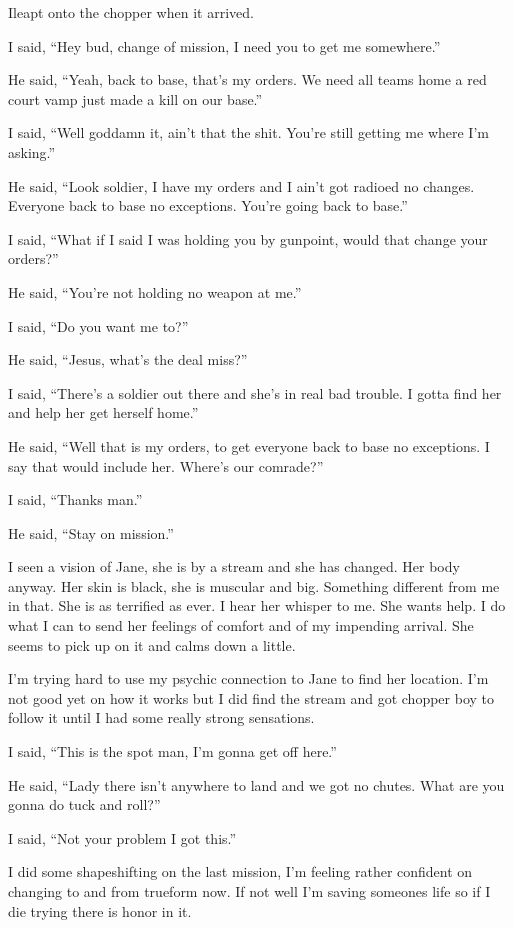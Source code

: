 \lettrine[lines=2,lraise=0]{I}\space leapt onto the chopper when it arrived.

I said, ``Hey bud, change of mission, I need you to get me somewhere.''

He said, ``Yeah, back to base, that's my orders. We need all teams home a red court vamp just made a kill on our base.''

I said, ``Well goddamn it, ain't that the shit. You're still getting me where I'm asking.''

He said, ``Look soldier, I have my orders and I ain't got radioed no changes. Everyone back to base no exceptions. You're going back to base.''

I said, ``What if I said I was holding you by gunpoint, would that change your orders?''

He said, ``You're not holding no weapon at me.''

I said, ``Do you want me to?''

He said, ``Jesus, what's the deal miss?''

I said, ``There's a soldier out there and she's in real bad trouble. I gotta find her and help her get herself home.''

He said, ``Well that is my orders, to get everyone back to base no exceptions. I say that would include her. Where's our comrade?''

I said, ``Thanks man.''

He said, ``Stay on mission.''


I seen a vision of Jane, she is by a stream and she has changed. Her body anyway. Her skin is black, she is muscular and big. Something different from me in that. She is as terrified as ever. I hear her whisper to me. She wants help. I do what I can to send her feelings of comfort and of my impending arrival. She seems to pick up on it and calms down a little.

\parasep

I'm trying hard to use my psychic connection to Jane to find her location. I'm not good yet on how it works but I did find the stream and got chopper boy to follow it until I had some really strong sensations.

I said, ``This is the spot man, I'm gonna get off here.''

He said, ``Lady there isn't anywhere to land and we got no chutes. What are you gonna do tuck and roll?''

I said, ``Not your problem I got this.''

I did some shapeshifting on the last mission, I'm feeling rather confident on changing to and from trueform now. If not well I'm saving someones life so if I die trying there is honor in it.

